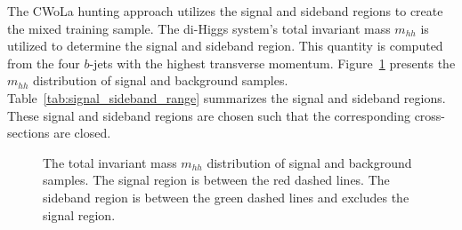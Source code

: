 \documentclass[12pt]{article}
\begin{document}
		The CWoLa hunting approach utilizes the signal and sideband regions to create the mixed training sample. The di-Higgs system's total invariant mass $m_{hh}$ is utilized to determine the signal and sideband region. This quantity is computed from the four $b$-jets with the highest transverse momentum. Figure~\ref{fig:mhh_distribution} presents the $m_{hh}$ distribution of signal and background samples. Table~\ref{tab:signal_sideband_range} summarizes the signal and sideband regions. These signal and sideband regions are chosen such that the corresponding cross-sections are closed.
		\begin{figure}[htpb]
			\centering
			\caption{The total invariant mass $m_{hh}$ distribution of signal and background samples. The signal region is between the red dashed lines. The sideband region is between the green dashed lines and excludes the signal region.}
			\label{fig:mhh_distribution}
		\end{figure}
\end{document}
